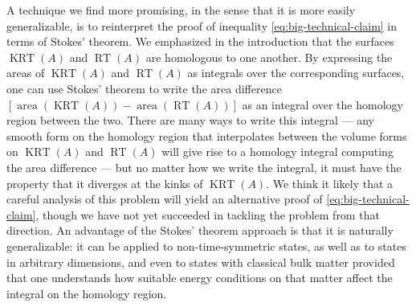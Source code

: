 \documentclass[a4paper,11pt]{article}
\newcommand{\area}{\operatorname{area}}
\newcommand{\RT}{\operatorname{RT}}
\newcommand{\KRT}{\operatorname{KRT}}
\begin{document}
A technique we find more promising, in the sense that it is more easily generalizable, is to reinterpret the proof of inequality \eqref{eq:big-technical-claim} in terms of Stokes' theorem. We emphasized in the introduction that the surfaces $\KRT(A)$ and $\RT(A)$ are homologous to one another. By expressing the areas of $\KRT(A)$ and $\RT(A)$ as integrals over the corresponding surfaces, one can use Stokes' theorem to write the area difference $[\area(\KRT(A)) - \area(\RT(A))]$ as an integral over the homology region between the two. There are many ways to write this integral --- any smooth form on the homology region that interpolates between the volume forms on $\KRT(A)$ and $\RT(A)$ will give rise to a homology integral computing the area difference --- but no matter how we write the integral, it must have the property that it diverges at the kinks of $\KRT(A)$. We think it likely that a careful analysis of this problem will yield an alternative proof of \eqref{eq:big-technical-claim}, though we have not yet succeeded in tackling the problem from that direction. An advantage of the Stokes' theorem approach is that it is naturally generalizable: it can be applied to non-time-symmetric states, as well as to states in arbitrary dimensions, and even to states with classical bulk matter provided that one understands how suitable energy conditions on that matter affect the integral on the homology region.
\end{document}
